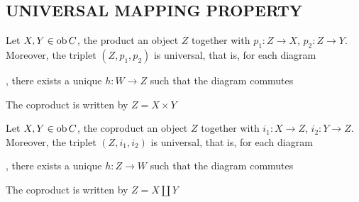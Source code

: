 \documentclass{report}
\begin{document}
\subsection{UNIVERSAL MAPPING PROPERTY}

\begin{definition}[product]
    Let $X, Y \in \operatorname{ob} C$, the product an object $Z$ together with $p_1: Z \to X$, $p_2: Z \to Y$. Moreover, the triplet $(Z, p_1, p_2)$ is universal, that is, for each diagram , there exists a unique $h: W \to Z$ such that the diagram commutes
    \begin{center}
    \end{center}
    The coproduct is written by $Z = X \times Y$
\end{definition}

\begin{definition}[coproduct]
    Let $X, Y \in \operatorname{ob} C$, the coproduct an object $Z$ together with $i_1: X \to Z$, $i_2: Y \to Z$. Moreover, the triplet $(Z, i_1, i_2)$ is universal, that is, for each diagram , there exists a unique $h: Z \to W$ such that the diagram commutes
    \begin{center}
    \end{center}
    The coproduct is written by $Z = X \amalg Y$
\end{definition}
\end{document}
